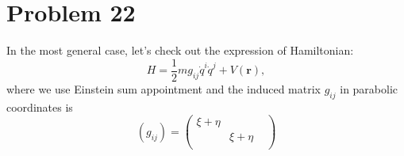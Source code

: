 \section*{Problem 22}

In the most general case, let's check out the expression of Hamiltonian:
\begin{equation}
    H = \frac{1}{2} m g_{ij} \dot{q}^i \dot{q}^j  +  V\left(\boldsymbol{r}\right),
\end{equation}
where we use Einstein sum appointment and the induced matrix $g_{ij}$ in parabolic coordinates is
\begin{equation}
    \left(g_{ij}\right)  = \left(
    \begin{matrix}
        \xi + \eta  &               &   \\
                    & \xi + \eta    &   \\
                    &               &   
    \end{matrix}
    \right)
\end{equation}